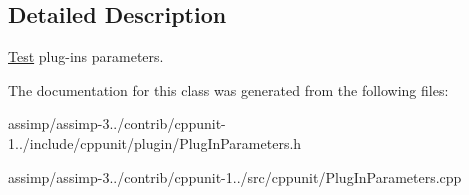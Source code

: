 \subsection{Detailed Description}
\hyperlink{class_test}{Test} plug-\/ins parameters. 

The documentation for this class was generated from the following files\+:\begin{DoxyCompactItemize}
\item 
assimp/assimp-\/3../contrib/cppunit-\/1../include/cppunit/plugin/Plug\+In\+Parameters.\+h\item 
assimp/assimp-\/3../contrib/cppunit-\/1../src/cppunit/Plug\+In\+Parameters.\+cpp\end{DoxyCompactItemize}
